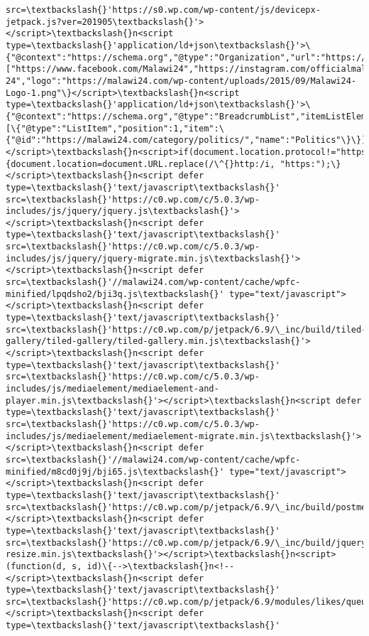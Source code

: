 \documentclass[11pt]{article}
\begin{document}
\begin{Verbatim}[commandchars=\\\{\}]
src=\textbackslash{}'https://s0.wp.com/wp-content/js/devicepx-jetpack.js?ver=201905\textbackslash{}'></script>\textbackslash{}n<script type=\textbackslash{}'application/ld+json\textbackslash{}'>\{"@context":"https://schema.org","@type":"Organization","url":"https://malawi24.com/","sameAs":["https://www.facebook.com/Malawi24","https://instagram.com/officialmalawi24","http://plus.google.com/+Malawi24official","https://www.youtube.com/malawi24official","https://twitter.com/Malawi24"],"@id":"https://malawi24.com/\#organization","name":"Malawi 24","logo":"https://malawi24.com/wp-content/uploads/2015/09/Malawi24-Logo-1.png"\}</script>\textbackslash{}n<script type=\textbackslash{}'application/ld+json\textbackslash{}'>\{"@context":"https://schema.org","@type":"BreadcrumbList","itemListElement":[\{"@type":"ListItem","position":1,"item":\{"@id":"https://malawi24.com/category/politics/","name":"Politics"\}\}]\}</script>\textbackslash{}n<script>if(document.location.protocol!="https:")\{document.location=document.URL.replace(/\^{}http:/i, "https:");\}</script>\textbackslash{}n<script defer type=\textbackslash{}'text/javascript\textbackslash{}' src=\textbackslash{}'https://c0.wp.com/c/5.0.3/wp-includes/js/jquery/jquery.js\textbackslash{}'></script>\textbackslash{}n<script defer type=\textbackslash{}'text/javascript\textbackslash{}' src=\textbackslash{}'https://c0.wp.com/c/5.0.3/wp-includes/js/jquery/jquery-migrate.min.js\textbackslash{}'></script>\textbackslash{}n<script defer src=\textbackslash{}'//malawi24.com/wp-content/cache/wpfc-minified/lpqdsho2/bji3q.js\textbackslash{}' type="text/javascript"></script>\textbackslash{}n<script defer type=\textbackslash{}'text/javascript\textbackslash{}' src=\textbackslash{}'https://c0.wp.com/p/jetpack/6.9/\_inc/build/tiled-gallery/tiled-gallery/tiled-gallery.min.js\textbackslash{}'></script>\textbackslash{}n<script defer type=\textbackslash{}'text/javascript\textbackslash{}' src=\textbackslash{}'https://c0.wp.com/c/5.0.3/wp-includes/js/mediaelement/mediaelement-and-player.min.js\textbackslash{}'></script>\textbackslash{}n<script defer type=\textbackslash{}'text/javascript\textbackslash{}' src=\textbackslash{}'https://c0.wp.com/c/5.0.3/wp-includes/js/mediaelement/mediaelement-migrate.min.js\textbackslash{}'></script>\textbackslash{}n<script defer src=\textbackslash{}'//malawi24.com/wp-content/cache/wpfc-minified/m8cd0j9j/bji65.js\textbackslash{}' type="text/javascript"></script>\textbackslash{}n<script defer type=\textbackslash{}'text/javascript\textbackslash{}' src=\textbackslash{}'https://c0.wp.com/p/jetpack/6.9/\_inc/build/postmessage.min.js\textbackslash{}'></script>\textbackslash{}n<script defer type=\textbackslash{}'text/javascript\textbackslash{}' src=\textbackslash{}'https://c0.wp.com/p/jetpack/6.9/\_inc/build/jquery.jetpack-resize.min.js\textbackslash{}'></script>\textbackslash{}n<script>(function(d, s, id)\{-->\textbackslash{}n<!--</script>\textbackslash{}n<script defer type=\textbackslash{}'text/javascript\textbackslash{}' src=\textbackslash{}'https://c0.wp.com/p/jetpack/6.9/modules/likes/queuehandler.js\textbackslash{}'></script>\textbackslash{}n<script defer type=\textbackslash{}'text/javascript\textbackslash{}' 
\end{Verbatim}
\end{document}
